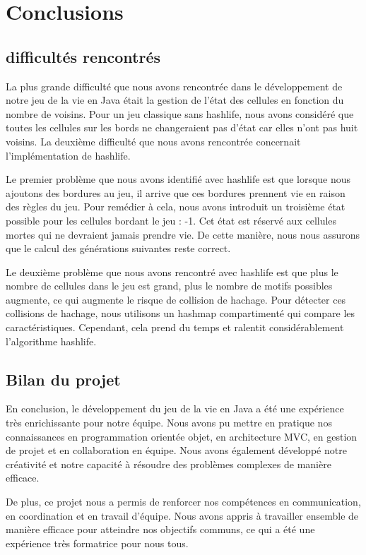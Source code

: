 \section{Conclusions}
\subsection{difficultés rencontrés}
La plus grande difficulté que nous avons rencontrée dans le développement de notre jeu de la vie en Java était la gestion de l'état des cellules en fonction du nombre de voisins. Pour un jeu classique sans hashlife, nous avons considéré que toutes les cellules sur les bords ne changeraient pas d'état car elles n'ont pas huit voisins. La deuxième difficulté que nous avons rencontrée concernait l'implémentation de hashlife.

Le premier problème que nous avons identifié avec hashlife est que lorsque nous ajoutons des bordures au jeu, il arrive que ces bordures prennent vie en raison des règles du jeu. Pour remédier à cela, nous avons introduit un troisième état possible pour les cellules bordant le jeu : -1. Cet état est réservé aux cellules mortes qui ne devraient jamais prendre vie. De cette manière, nous nous assurons que le calcul des générations suivantes reste correct.

Le deuxième problème que nous avons rencontré avec hashlife est que plus le nombre de cellules dans le jeu est grand, plus le nombre de motifs possibles augmente, ce qui augmente le risque de collision de hachage. Pour détecter ces collisions de hachage, nous utilisons un hashmap compartimenté qui compare les caractéristiques. Cependant, cela prend du temps et ralentit considérablement l'algorithme hashlife. 
\subsection{Bilan du projet}
En conclusion, le développement du jeu de la vie en Java a été une expérience très enrichissante pour notre équipe. Nous avons pu mettre en pratique nos connaissances en programmation orientée objet, en architecture MVC, en gestion de projet et en collaboration en équipe. Nous avons également développé notre créativité et notre capacité à résoudre des problèmes complexes de manière efficace.

De plus, ce projet nous a permis de renforcer nos compétences en communication, en coordination et en travail d'équipe. Nous avons appris à travailler ensemble de manière efficace pour atteindre nos objectifs communs, ce qui a été une expérience très formatrice pour nous tous.
